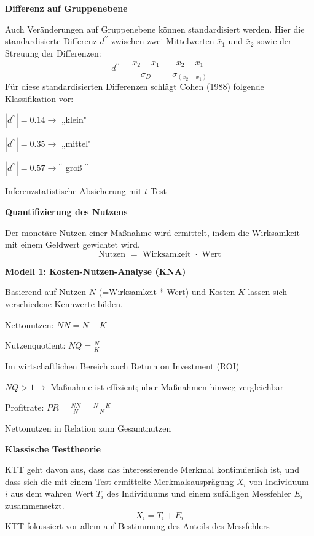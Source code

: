 \documentclass[10pt, letterpaper]{article}
\begin{document}
\pagebreak

\textbf{Differenz auf Gruppenebene}

Auch Veränderungen auf Gruppenebene können standardisiert werden. Hier die standardisierte Differenz $d^{\prime \prime}$ zwischen zwei Mittelwerten $\bar{x}_1$ und $\bar{x}_2$ sowie der Streuung der Differenzen:
$$
d^{\prime \prime}=\frac{\bar{x}_2-\bar{x}_1}{\sigma_D}=\frac{\bar{x}_2-\bar{x}_1}{\sigma_{\left(x_2-x_1\right)}}
$$
Für diese standardisierten Differenzen schlägt Cohen (1988) folgende Klassifikation vor:

$\left|d^{\prime \prime}\right|=0.14 \rightarrow$ „klein"

$\left|d^{\prime \prime}\right|=0.35 \rightarrow$ „mittel"

$\left|d^{\prime \prime}\right|=0.57 \rightarrow{ }^{\prime \prime}$ groß $^{\prime \prime}$

Inferenzstatistische Absicherung mit $t$-Test
\vspace{0.4cm}

\textbf{Quantifizierung des Nutzens}

Der monetäre Nutzen einer Maßnahme wird ermittelt, indem die Wirksamkeit mit einem Geldwert gewichtet wird.
$$
\text { Nutzen }=\text { Wirksamkeit } \cdot \text { Wert }
$$



\textbf{Modell 1: Kosten-Nutzen-Analyse (KNA)}

Basierend auf Nutzen $N$ (=Wirksamkeit * Wert) und Kosten $K$ lassen sich verschiedene Kennwerte bilden.

Nettonutzen: $N N=N-K$

Nutzenquotient: $N Q=\frac{N}{K}$

Im wirtschaftlichen Bereich auch Return on Investment (ROI)

$N Q>1 \rightarrow$ Maßnahme ist effizient; über Maßnahmen hinweg vergleichbar

Profitrate: $P R=\frac{N N}{N}=\frac{N-K}{N}$

Nettonutzen in Relation zum Gesamtnutzen
\vspace{0.4cm}

\textbf{Klassische Testtheorie}

KTT geht davon aus, dass das interessierende Merkmal kontinuierlich ist, und dass sich die mit einem Test ermittelte Merkmalsausprägung $X_i$ von Individuum $i$ aus dem wahren Wert $T_i$ des Individuums und einem zufälligen Messfehler $E_i$ zusammensetzt.
$$
X_i=T_i+E_i
$$
KTT fokussiert vor allem auf Bestimmung des Anteils des Messfehlers
\end{document}
